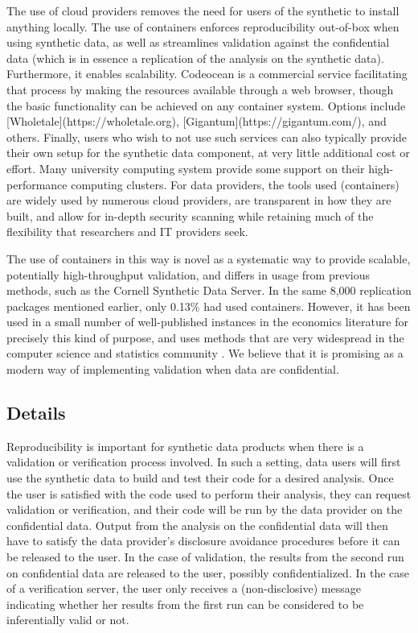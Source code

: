 \documentclass[]{hdsr}
\begin{document}
The use of cloud providers removes the need for users of the synthetic to install anything locally. The use of containers enforces reproducibility out-of-box when using synthetic data, as well as streamlines validation against the confidential data (which is in essence a replication of the analysis on the synthetic data). Furthermore, it enables scalability. Codeocean is a commercial service facilitating that process by making the resources available through a web browser, though the basic functionality can be achieved on any container system. Options include [Wholetale](https://wholetale.org), [Gigantum](https://gigantum.com/), and others. Finally, users who wish to not use such services can also typically provide their own setup for the synthetic data component, at very little additional cost or effort. Many university computing system provide some support on their high-performance computing clusters. For data providers, the tools used (containers) are widely used by numerous cloud providers, are transparent in how they are built, and allow for in-depth security scanning while retaining much of the flexibility that researchers and IT providers seek.

The use of containers in this way is novel as a systematic way to provide scalable, potentially high-throughput validation, and differs in usage from previous methods, such as the Cornell Synthetic Data Server. In the same 8,000 replication packages mentioned earlier, only 0.13\% had used containers. However, it has been used in a small number of well-published instances in the economics literature for precisely this kind of purpose, and uses methods that are very widespread in the computer science and statistics community \citep{boettiger_introduction_2015,moreau_containers_2023}. We believe that it is promising as a modern way of implementing validation when data are confidential.

\subsection{Details}


Reproducibility is important for synthetic data products when there
is a validation or verification process involved. In such a setting, data users will first use the synthetic
data to build and test their code for a desired analysis. Once the user is satisfied with the code used to
perform their analysis, they can request validation or verification, and their code will be run by the data provider on the confidential data. Output from the analysis on the confidential data will then have to satisfy the data provider's disclosure avoidance procedures before it can be released to the user. In the case of validation, the results from the second run on confidential data are released to the user, possibly confidentialized. In the case of a verification server, the user only receives a (non-disclosive) message indicating whether her results from the first run can be considered to be inferentially valid or not.
\end{document}
